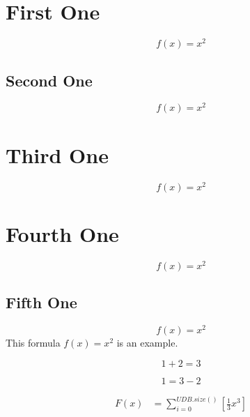 \documentclass{article}
\begin{document}
\tableofcontents
\listoffigures
\listoftables
\newpage
{}
\section{First One}
\begin{equation}
  f(x) = x^2
\end{equation}

\subsection{Second One}
\begin{equation}
  f(x) = x^2
\end{equation}
\newpage
\section{Third One}
\begin{equation*}
  f(x) = x^2
\end{equation*}
\newpage
\section{Fourth One}
\begin{equation*}
  f(x) = x^2
\end{equation*}
\subsection{Fifth One}

\begin{equation*}
  f(x) = x^2
\end{equation*}
This formula $f(x) = x^2$ is an example.


\begin{equation*}
  1 + 2 = 3 
\end{equation*}

\begin{equation*}
  1 = 3 - 2
\end{equation*}

\begin{align*}
 F(x) &= \sum^{UDB.size()}_{i=0} [ \frac{1}{3}x^3 ]
\end{align*}

\end{document}

